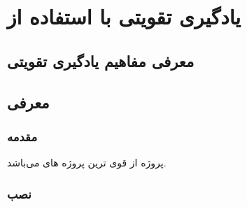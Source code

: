 \chapter{یادگیری تقویتی با استفاده از }
\section{معرفی مفاهیم یادگیری تقویتی}

\section{معرفی }
\subsection{مقدمه}
پروژه  از قوی ترین پروژه های
می‌باشد.
\subsection{نصب}












